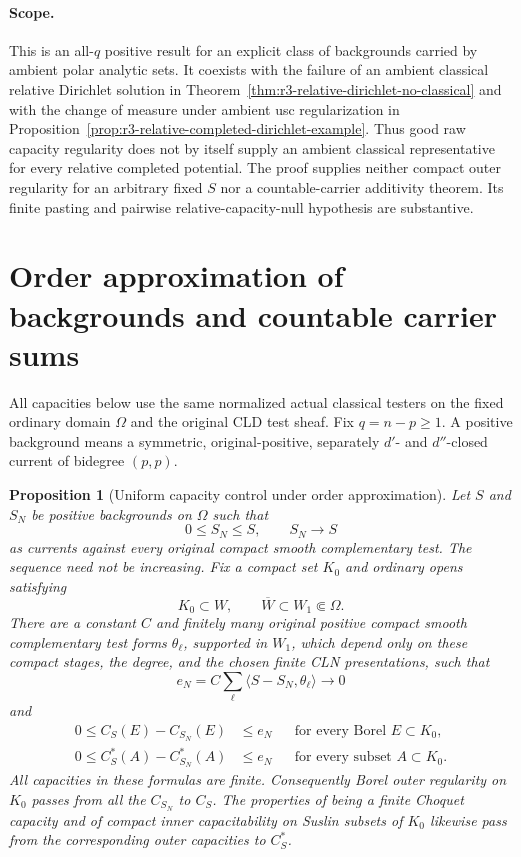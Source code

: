 \documentclass[11pt,a4paper]{article}
\numberwithin{equation}{section}
\newtheorem{proposition}[theorem]{Proposition}
\theoremstyle{definition}
\theoremstyle{remark}
\begin{document}
\paragraph{Scope.}
This is an all-$q$ positive result for an explicit class of
backgrounds carried by ambient polar analytic sets.  It coexists
with the failure of an ambient classical relative Dirichlet solution
in Theorem~\ref{thm:r3-relative-dirichlet-no-classical} and with the
change of measure under ambient usc regularization in
Proposition~\ref{prop:r3-relative-completed-dirichlet-example}.
Thus good raw capacity regularity does not by itself supply an
ambient classical representative for every relative completed
potential.  The proof supplies neither compact outer regularity
for an arbitrary fixed $S$ nor a countable-carrier additivity
theorem.  Its finite pasting and pairwise relative-capacity-null
hypothesis are substantive.



\section{Order approximation of backgrounds and countable carrier sums}
\label{sec:r3-capacity-order-approximation}

All capacities below use the same normalized actual classical testers
on the fixed ordinary domain $\Omega$ and the original CLD test sheaf.
Fix $q=n-p\geq1$.  A positive background means a symmetric,
original-positive, separately $d'$- and $d''$-closed current of
bidegree $(p,p)$.

\begin{proposition}[Uniform capacity control under order approximation]
\label{prop:r3-capacity-order-approximation}
Let $S$ and $S_N$ be positive backgrounds on $\Omega$ such that
\[
 0\leq S_N\leq S,\qquad S_N\longrightarrow S
\]
as currents against every original compact smooth complementary
test.  The sequence need not be increasing.  Fix a compact set $K_0$
and ordinary opens satisfying
\[
 K_0\subset W,\qquad \overline W\subset W_1\Subset\Omega.
\]
There are a constant $C$ and finitely many original positive compact
smooth complementary test forms $\theta_\ell$, supported in $W_1$,
which depend only on these compact stages, the degree, and the
chosen finite CLN presentations, such that
\[
 e_N=C\sum_\ell\langle S-S_N,\theta_\ell\rangle\longrightarrow0
\]
and
\begin{align}
 0\leq C_S(E)-C_{S_N}(E)&\leq e_N
       &&\text{for every Borel }E\subset K_0,\label{eq:r3-order-raw}\\
 0\leq C_S^*(A)-C_{S_N}^*(A)&\leq e_N
       &&\text{for every subset }A\subset K_0.\label{eq:r3-order-outer}
\end{align}
All capacities in these formulas are finite.  Consequently Borel
outer regularity on $K_0$ passes from all the $C_{S_N}$ to $C_S$.
The properties of being a finite Choquet capacity and of compact
inner capacitability on Suslin subsets of $K_0$ likewise pass from
the corresponding outer capacities to $C_S^*$.
\end{proposition}
\end{document}
